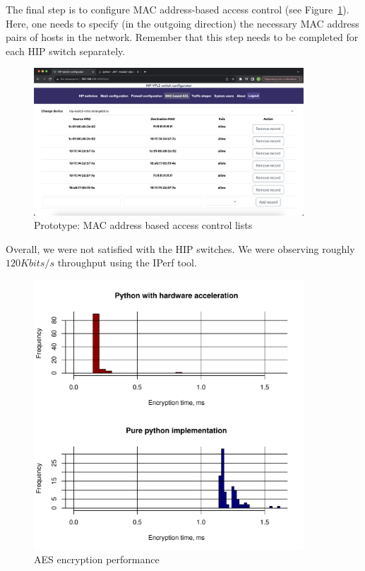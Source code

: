 The final step is to configure MAC address-based access control 
(see Figure~\ref{fig:mac}). Here, one needs to specify (in the 
outgoing direction) the necessary MAC address pairs of hosts in 
the network. Remember that this step needs to be completed for 
each HIP switch separately.

\begin{figure}[h!]
\centering
\includegraphics[width=0.9\textwidth]{graphics/MAC-ACL.png}
\caption{Prototype: MAC address based access control lists}
\label{fig:mac}
\end{figure}
\clearpage



Overall, we were not satisfied with the HIP switches. We were observing 
roughly $120 Kbits/s$ throughput using the IPerf tool. 

\begin{figure}[h!]
\centering
\includegraphics[width=0.9\textwidth]{graphics/AES.pdf}
\caption{AES encryption performance}
\label{fig:aes}
\end{figure}

